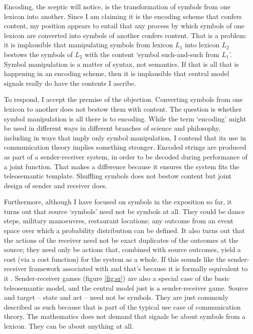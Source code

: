 \documentclass[12pt]{article}
\begin{document}
Encoding, the sceptic will notice, is the transformation of symbols from one lexicon into another.
Since I am claiming it is the encoding scheme that confers content, my position appears to entail that any process by which symbols of one lexicon are converted into symbols of another confers content.
That is a problem: it is implausible that manipulating symbols from lexicon $L_1$ into lexicon $L_2$ bestows the symbols of $L_2$ with the content `symbol such-and-such from $L_1$'.
Symbol manipulation is a matter of syntax, not semantics.
If that is all that is happening in an encoding scheme, then it is implausible that central model signals really do have the contents I ascribe.

To respond, I accept the premise of the objection.
Converting symbols from one lexicon to another does not bestow them with content.
The question is whether symbol manipulation is all there is to encoding.
While the term `encoding' might be used in different ways in different branches of science and philosophy, including in ways that imply only symbol manipulation, I contend that its use in communication theory implies something stronger.
Encoded strings are produced as part of a sender-receiver system, in order to be decoded during performance of a joint function.
That makes a difference because it ensures the system fits the teleosemantic template.
Shuffling symbols does not bestow content but joint design of sender and receiver does.

Furthermore, although I have focused on symbols in the exposition so far, it turns out that source `symbols' need not be symbols at all.
They could be dance steps, military manoeuvres, restaurant locations; any outcome from an event space over which a probability distribution can be defined.
It also turns out that the actions of the receiver need not be exact duplicates of the outcomes at the source; they need only be actions that, combined with source outcomes, yield a cost (via a cost function) for the system as a whole.
If this sounds like the sender-receiver framework associated with \citet{skyrms2010signals} and \citet{lewis1969convention} that's because it is formally equivalent to it \citep{martinez2019deception}.
Sender-receiver games (figure \ref{fig:sr}) are also a special case of the basic teleosemantic model, and the central model just is a sender-receiver game.
Source and target -- state and act -- need not be symbols.
They are just commonly described as such because that is part of the typical use case of communication theory.
The mathematics does not demand that signals be about symbols from a lexicon.
They can be about anything at all.
\end{document}
